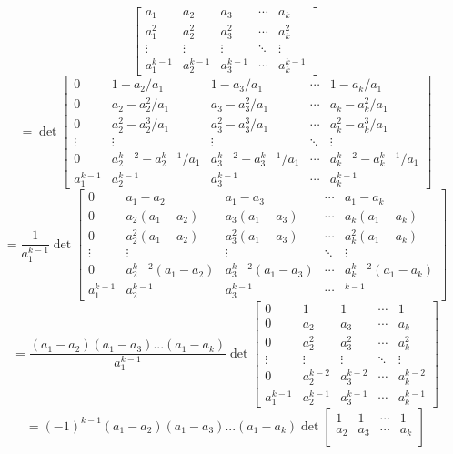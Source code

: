 \begin{description}
\begin{itemize}
$$\begin{bmatrix}
a_1 & a_2 & a_3 & \cdots & a_k \\
a_1^2 & a_2^2 & a_3^2 & \cdots & a_k^2 \\
\vdots & \vdots & \vdots & \ddots & \vdots \\
a_1^{k-1} & a_2^{k-1} & a_3^{k-1} & \cdots & a_k^{k-1}
\end{bmatrix}$$ 
$$= \det\begin{bmatrix}
0 & 1 - a_2/a_1 & 1 - a_3/a_1 & \cdots & 1 - a_k/a_1 \\
0 & a_2 - a_2^2/a_1 & a_3 - a_3^2/a_1 & \cdots & a_k - a_k^2/a_1 \\
0 & a_2^2 - a_2^3/a_1 & a_3^2 - a_3^3/a_1 & \cdots & a_k^2 - a_k^3/a_1 \\
\vdots & \vdots & \vdots & \ddots & \vdots \\
0 & a_2^{k-2} - a_2^{k-1}/a_1 & a_3^{k-2} - a_3^{k-1}/a_1 & \cdots & a_k^{k-2} - a_k^{k-1}/a_1 \\
a_1^{k-1} & a_2^{k-1} & a_3^{k-1} & \cdots & a_k^{k-1}
\end{bmatrix}$$
$$= \frac{1}{a_1^{k-1}}\det\begin{bmatrix}
0 & a_1 - a_2 & a_1 - a_3 & \cdots & a_1 - a_k \\
0 & a_2(a_1 - a_2) & a_3(a_1 - a_3) & \cdots & a_k(a_1 - a_k) \\
0 & a_2^2(a_1 - a_2) & a_3^2(a_1 - a_3) & \cdots & a_k^2(a_1 - a_k) \\
\vdots & \vdots & \vdots & \ddots & \vdots \\
0 & a_2^{k-2}(a_1 - a_2) & a_3^{k-2}(a_1 - a_3) & \cdots & a_k^{k-2}(a_1 - a_k) \\
a_1^{k-1} & a_2^{k-1} & a_3^{k-1} & \cdots & ^{k-1}
\end{bmatrix}$$
$$= \frac{(a_1 - a_2)(a_1 - a_3)...(a_1 - a_k)}{a_1^{k-1}}\det\begin{bmatrix}
0 & 1 & 1 & \cdots & 1 \\
0 & a_2 & a_3 & \cdots & a_k \\
0 & a_2^2 & a_3^2 & \cdots & a_k^2 \\
\vdots & \vdots & \vdots & \ddots & \vdots \\
0 & a_2^{k-2} & a_3^{k-2} & \cdots & a_k^{k-2} \\
a_1^{k-1} & a_2^{k-1} & a_3^{k-1} & \cdots & a_k^{k-1}
\end{bmatrix}$$
$$= (-1)^{k-1}(a_1 - a_2)(a_1 - a_3)...(a_1 - a_k)\det\begin{bmatrix}
1 & 1 & \cdots & 1 \\
a_2 & a_3 & \cdots & a_k \\

\end{bmatrix}$$
\end{itemize}
\end{description}
